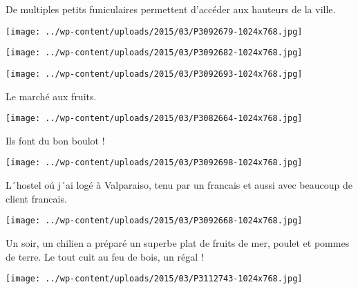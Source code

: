  De multiples petits funiculaires permettent d'accéder aux hauteurs de la ville.

 

\begin{center} \texttt{[image: ../wp-content/uploads/2015/03/P3092679-1024x768.jpg]} \end{center}

 

\begin{center} \texttt{[image: ../wp-content/uploads/2015/03/P3092682-1024x768.jpg]} \end{center}

 

\begin{center} \texttt{[image: ../wp-content/uploads/2015/03/P3092693-1024x768.jpg]} \end{center}

Le marché aux fruits.

 

\begin{center} \texttt{[image: ../wp-content/uploads/2015/03/P3082664-1024x768.jpg]} \end{center}

Ils font du bon boulot !

\begin{center} \texttt{[image: ../wp-content/uploads/2015/03/P3092698-1024x768.jpg]} \end{center}



 L´hostel oú j´ai logé à Valparaiso, tenu par un francais et aussi avec beaucoup de client francais.

 

\begin{center} \texttt{[image: ../wp-content/uploads/2015/03/P3092668-1024x768.jpg]} \end{center}



 Un soir, un chilien a préparé un superbe plat de fruits de mer, poulet et pommes de terre. Le tout cuit au feu de bois, un régal !

 

\begin{center} \texttt{[image: ../wp-content/uploads/2015/03/P3112743-1024x768.jpg]} \end{center}



 

